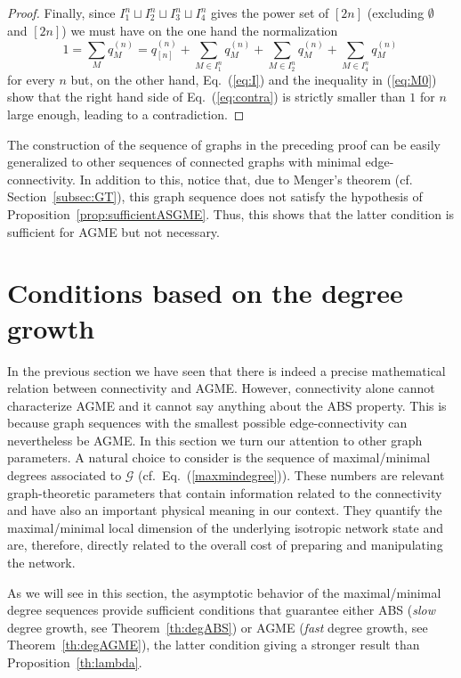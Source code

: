 \documentclass[a4paper,onecolumn,accepted=2024-12-14]{quantumarticle}
\theoremstyle{plain}
\newcommand{\cG}{{\mathcal G}}         %
\begin{document}
\begin{proof}
Finally, since $I_1^n\sqcup I_2^n\sqcup I_3^n\sqcup I_4^n$ gives the power set of $[2n]$ (excluding $\emptyset$ and $[2n]$) we must have on the one hand the normalization
\begin{equation}\label{eq:contra}
 1=\sum_M q^{(n)}_M
  = q_{[n]}^{(n)}+\sum_{M\in I_1^n}q_M^{(n)}
    +\sum_{M\in I_2^n}q_M^{(n)}+\sum_{M\in I_4^n}q_M^{(n)}\,
\end{equation}for every $n$ but, on the other hand, Eq.~(\ref{eq:I}) and the inequality in (\ref{eq:M0})
show that the right hand side of Eq.~(\ref{eq:contra}) is strictly smaller than $1$
for $n$ large enough, leading to a contradiction.
\end{proof}

The construction of the sequence of graphs in the preceding proof can be easily generalized to other sequences of connected graphs with minimal edge-connectivity. In addition to this, notice that, due to Menger's theorem (cf. Section~\ref{subsec:GT}), this graph sequence does not satisfy the hypothesis of
Proposition~\ref{prop:sufficientASGME}. Thus, this shows that the latter condition is sufficient for AGME but not necessary.


\section{Conditions based on the degree growth}\label{secdeg}

In the previous section we have seen that there is indeed a precise mathematical relation between connectivity and AGME. However, connectivity alone cannot characterize AGME and it cannot say anything about the ABS property. This is because graph sequences with the smallest possible edge-connectivity can nevertheless be AGME. In this section we turn our attention to other graph parameters. A natural choice to consider is the sequence of maximal/minimal degrees associated to $\cG$ (cf.\ Eq.~(\ref{maxmindegree})).
These numbers are relevant graph-theoretic parameters that contain information related to the connectivity and have also an important physical meaning in our context. They quantify the maximal/minimal local dimension of the underlying isotropic network state and are, therefore, directly related to the overall cost of preparing and manipulating the network.

As we will see in this section, the asymptotic behavior of the maximal/minimal degree sequences provide
sufficient conditions that guarantee either ABS (\textit{slow} degree growth, see Theorem~\ref{th:degABS}) or
AGME (\textit{fast} degree growth, see Theorem~\ref{th:degAGME}), the
latter condition giving a stronger result than Proposition~\ref{th:lambda}.
\end{document}
